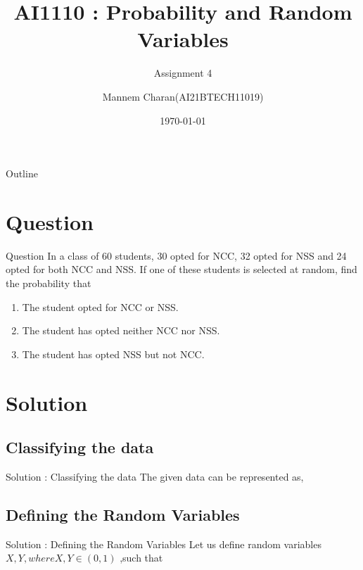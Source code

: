 \documentclass{beamer}
\title{AI1110 : Probability and Random Variables}
\subtitle{Assignment 4}
\author{Mannem Charan(AI21BTECH11019)}
\date{\today}
\providecommand{\brak}[1]{\ensuremath{\left(#1\right)}}
\begin{document}
\begin{frame}
    \titlepage 
\end{frame}


\begin{frame}{Outline}
    \tableofcontents
\end{frame}


\section{Question}
\begin{frame}{Question}
 In a class of 60 students, 30 opted for NCC, 32 opted for NSS and 24 opted for both NCC and NSS. If one of these students is selected at random, find the probability that
\begin{enumerate}[label = (\alph{enumi})]
    \item The student opted for NCC or NSS.
    \item The student has opted neither NCC nor NSS.
    \item The student has opted NSS but not NCC.
\end{enumerate}
\end{frame}


\section{Solution}
\subsection{Classifying the data}
\begin{frame}{Solution : Classifying the data}
        The given data can be represented as,
	        \begin{table}[ht!]
        
        \caption{}
        \label{table:table 1}
       \end{table}
  \end{frame}
\subsection{Defining the Random Variables}
\begin{frame}{ Solution : Defining the Random Variables}
  Let us define random variables $X,Y, where X,Y \in  \brak{0,1}$ ,such that
        \begin{table}[ht!]
        
        \caption{}
        \label{table:table 2}
       \end{table}
 \end{frame}
   
\end{document}
